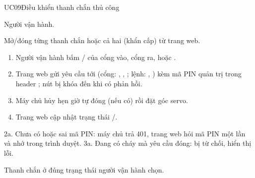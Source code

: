 \begin{usecase}{UC09}{Điều khiển thanh chắn thủ công}
\item[Tác nhân] Người vận hành.
\item[Mô tả] Mở/đóng từng thanh chắn hoặc cả hai (khẩn cấp) từ trang web.
\item[Luồng chính] \begin{enumerate}[nosep,leftmargin=1.3em]
  \item Người vận hành bấm / của cổng vào, cổng ra, hoặc
        .
  \item Trang web gửi yêu cầu  tới  (cổng: , , ; lệnh: , ) kèm mã PIN quản trị trong header ; nút bị khóa đến khi có phản hồi.
  \item Máy chủ hủy hẹn giờ tự đóng (nếu có) rồi đặt góc servo.
  \item Trang web cập nhật trạng thái /.
\end{enumerate}
\item[Ngoại lệ] 2a. Chưa có hoặc sai mã PIN: máy chủ trả 401, trang web hỏi mã PIN một lần
      và nhớ trong trình duyệt. 3a. Đang có cháy mà yêu cầu đóng: bị từ chối, hiển thị lỗi.
\item[Hậu điều kiện] Thanh chắn ở đúng trạng thái người vận hành chọn.
\end{usecase}


